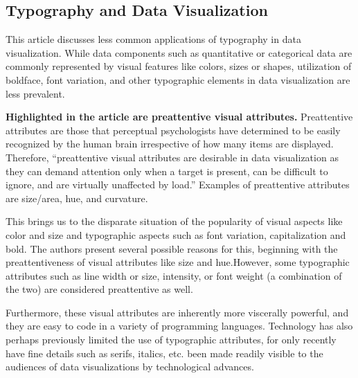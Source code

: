 \documentclass[]{book}
\theoremstyle{definition}
\theoremstyle{definition}
\theoremstyle{definition}
\theoremstyle{remark}
\begin{document}
\subsection{Typography and Data
Visualization}\label{typography-and-data-visualization}

This article discusses less common applications of typography in data
visualization. While data components such as quantitative or categorical
data are commonly represented by visual features like colors, sizes or
shapes, utilization of boldface, font variation, and other typographic
elements in data visualization are less prevalent.

\textbf{Highlighted in the article are preattentive visual attributes.}
Preattentive attributes are those that perceptual psychologists have
determined to be easily recognized by the human brain irrespective of
how many items are displayed. Therefore, ``preattentive visual
attributes are desirable in data visualization as they can demand
attention only when a target is present, can be difficult to ignore, and
are virtually unaffected by load.'' Examples of preattentive attributes
are size/area, hue, and curvature.

This brings us to the disparate situation of the popularity of visual
aspects like color and size and typographic aspects such as font
variation, capitalization and bold. The authors present several possible
reasons for this, beginning with the preattentiveness of visual
attributes like size and hue.However, some typographic attributes such
as line width or size, intensity, or font weight (a combination of the
two) are considered preattentive as well.

Furthermore, these visual attributes are inherently more viscerally
powerful, and they are easy to code in a variety of programming
languages. Technology has also perhaps previously limited the use of
typographic attributes, for only recently have fine details such as
serifs, italics, etc. been made readily visible to the audiences of data
visualizations by technological advances.
\end{document}
